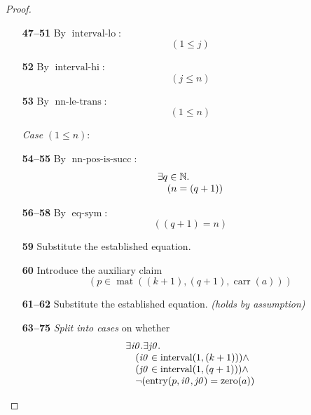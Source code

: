 \documentclass[11pt]{article}
\theoremstyle{plain}
\begin{document}
\begin{proof}
\begin{itemize}[leftmargin=2.8em, itemsep=4pt, parsep=1pt]
  \item[\textbf{47--51}] By $\operatorname{interval\text{-}lo}$:
\begin{equation*}
(1 \leq j)
\end{equation*}

  \item[\textbf{52}] By $\operatorname{interval\text{-}hi}$:
\begin{equation*}
(j \leq n)
\end{equation*}

  \item[\textbf{53}] By $\operatorname{nn\text{-}le\text{-}trans}$:
\begin{equation*}
(1 \leq n)
\end{equation*}

  \item[]\emph{Case} $(1 \leq n)$:
  \item[\textbf{54--55}] By $\operatorname{nn\text{-}pos\text{-}is\text{-}succ}$:
\begin{equation*}
\begin{array}{@{}l@{}} \exists q \in \mathbb{N}. \\ \quad (n = (q + 1)) \end{array}
\end{equation*}

  \item[\textbf{56--58}] By $\operatorname{eq\text{-}sym}$:
\begin{equation*}
((q + 1) = n)
\end{equation*}

  \item[\textbf{59}] Substitute the established equation.
  \item[\textbf{60}] Introduce the auxiliary claim
\begin{equation*}
(p \in \operatorname{mat}((k + 1), (q + 1), \operatorname{carr}(a)))
\end{equation*}

  \item[\textbf{61--62}] Substitute the established equation.  \emph{(holds by assumption)}
  \item[\textbf{63--75}] \emph{Split into cases} on whether
\begin{equation*}
\begin{array}{@{}l@{}} \exists \mathit{i0}. \exists \mathit{j0}. \\ \quad (\mathit{i0} \in \operatorname{interval}(1, (k + 1))) \wedge \\ \quad (\mathit{j0} \in \operatorname{interval}(1, (q + 1))) \wedge \\ \quad \neg (\operatorname{entry}(p, \mathit{i0}, \mathit{j0}) = \operatorname{zero}(a)) \end{array}
\end{equation*}


\end{itemize}
\end{proof}
\end{document}
